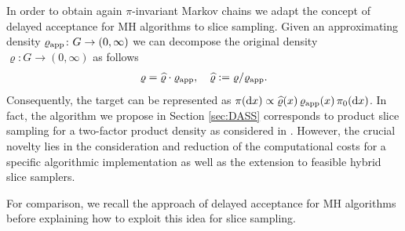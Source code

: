 \documentclass[sn-mathphys-num]{sn-jnl}%
\theoremstyle{thmstyleone}%
\theoremstyle{thmstyletwo}%
\theoremstyle{thmstylethree}%
\newcommand{\rhoapp}{\varrho_{{\rm app}}}
\begin{document}
In order to obtain again $\pi$-invariant Markov chains 
we adapt the concept of delayed acceptance for MH algorithms \cite{ChristenFox2005} to slice sampling.
Given an approximating density $\rhoapp\colon G\to(0,\infty)$ we can decompose the original density $\varrho\colon G\to(0,\infty)$ as follows
\begin{align}
	\varrho = \widehat{\varrho} \cdot \rhoapp, \quad \widehat{\varrho}:=\varrho/\rhoapp \label{PMLR:factorization}.
\end{align}  
Consequently, the target can be represented as $ \pi(\text{d} x) \propto \widehat{\varrho}(x) \, \rhoapp(x) \, \pi_0(\text{d}x)$. 
In fact, the algorithm we propose in Section \ref{sec:DASS} corresponds to product slice sampling for a two-factor product density as considered in \cite{RobertsRosenthal1999, MiraTierney2002}.
However, the crucial novelty lies in the consideration and reduction of the computational costs for a specific algorithmic implementation as well as the extension to feasible hybrid slice samplers. 

For comparison, we recall the approach of delayed acceptance for MH algorithms before explaining how to exploit this idea for slice sampling. 
\end{document}
